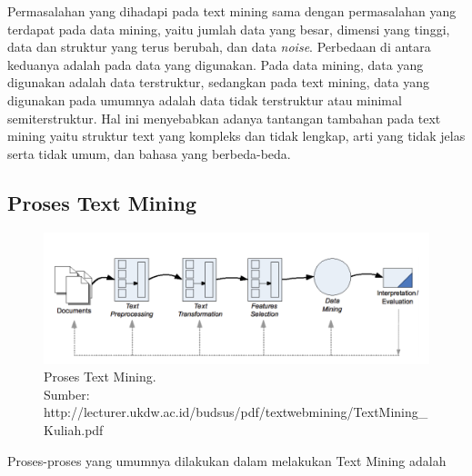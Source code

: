 Permasalahan yang dihadapi pada text mining sama dengan permasalahan yang terdapat pada data mining, yaitu jumlah data yang besar, dimensi yang tinggi, data dan struktur yang terus berubah, dan data \textit{noise}. Perbedaan di antara keduanya adalah pada data yang digunakan. Pada data mining, data yang digunakan adalah data terstruktur, sedangkan pada text mining, data yang digunakan pada umumnya adalah data tidak terstruktur atau minimal semiterstruktur. Hal ini menyebabkan adanya tantangan tambahan pada text mining yaitu struktur text yang kompleks dan tidak lengkap, arti yang tidak jelas serta tidak umum, dan bahasa yang berbeda-beda.

\subsection{Proses Text Mining}
\begin{figure}
\centering
\includegraphics[scale=0.5]{Gambar/proses-text-mining.png}
\caption[Proses Text Mining]{Proses Text Mining.\\Sumber: http://lecturer.ukdw.ac.id/budsus/pdf/textwebmining/TextMining\_Kuliah.pdf} 
\end{figure}

Proses-proses yang umumnya dilakukan dalam melakukan Text Mining adalah

